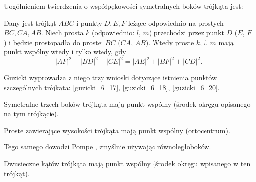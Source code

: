 %

Uogólnieniem twierdzenia o współpękowości symetralnych boków trójkąta jest:

\begin{proposition}
\label{guzicki_6_13}%
	Dany jest trójkąt $ABC$ i punkty $D, E, F$ leżące odpowiednio na prostych $BC, CA, AB$.
	Niech prosta $k$ (odpowiednio: $l$, $m$) przechodzi przez punkt $D$ ($E$, $F$) i będzie prostopadła do prostej $BC$ ($CA$, $AB$).
	Wtedy proste $k$, $l$, $m$ mają punkt wspólny wtedy i tylko wtedy, gdy
	\begin{equation}
		|AF|^2 + |BD|^2 + |CE|^2 = |AE|^2 + |BF|^2 + |CD|^2.
	\end{equation}
\end{proposition}

Guzicki \cite[s. 176]{guzicki_2021} wyprowadza z niego trzy wnioski dotyczące istnienia punktów szczególnych trójkąta: \ref{guzicki_6_17}, \ref{guzicki_6_18}, \ref{guzicki_6_20}.

\begin{corollary}
\label{guzicki_6_17}%
    Symetralne trzech boków trójkąta mają punkt wspólny (środek okręgu opisanego na tym trójkącie).
\end{corollary}

\begin{corollary}
\label{guzicki_6_18}%
    Proste zawierające wysokości trójkąta mają punkt wspólny (ortocentrum).
%
\end{corollary}

Tego samego dowodzi Pompe \cite[s. 38]{pompe_2022}, zmyślnie używając równoległoboków.

\begin{corollary}
\label{guzicki_6_20}%
    Dwusieczne kątów trójkąta mają punkt wspólny (środek okręgu wpisanego w ten trójkąt).
\end{corollary}

%